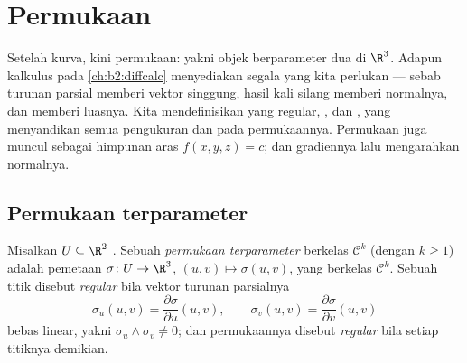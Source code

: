 \chapter{Permukaan}\label{ch:b2:surfaces}

Setelah kurva, kini permukaan: yakni objek berparameter dua di $\R^3$. Adapun
kalkulus  pada \cref{ch:b2:diffcalc} menyediakan segala yang
kita perlukan --- sebab turunan parsial memberi vektor singgung, hasil kali
silang memberi normalnya, dan  memberi luasnya. Kita mendefinisikan
 yang regular, , dan
\emph{}, yang menyandikan semua pengukuran 
dan  pada permukaannya. Permukaan juga muncul sebagai himpunan aras
$f(x, y, z) = c$; dan gradiennya lalu mengarahkan normalnya.

\section{Permukaan terparameter}

\begin{definition}\label{def:b2:surfaces:param}
Misalkan $U \subseteq \R^2$ . Sebuah \emph{permukaan
terparameter} berkelas
$\mathcal{C}^k$ (dengan $k \geq 1$) adalah pemetaan $\sigma \colon U \to
\R^3$, $(u, v) \mapsto \sigma(u, v)$, yang berkelas $\mathcal{C}^k$. Sebuah
titik disebut \emph{regular} bila vektor turunan parsialnya
\[
\sigma_u(u, v) = \frac{\partial\sigma}{\partial u}(u,v),
\qquad
\sigma_v(u, v) = \frac{\partial\sigma}{\partial v}(u,v)
\]
bebas linear, yakni $\sigma_u \wedge \sigma_v \neq 0$;
dan permukaannya disebut \emph{regular} bila setiap titiknya demikian.
\end{definition}

